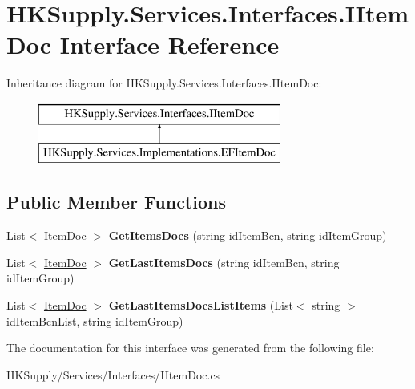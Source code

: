 \hypertarget{interface_h_k_supply_1_1_services_1_1_interfaces_1_1_i_item_doc}{}\section{H\+K\+Supply.\+Services.\+Interfaces.\+I\+Item\+Doc Interface Reference}
\label{interface_h_k_supply_1_1_services_1_1_interfaces_1_1_i_item_doc}
Inheritance diagram for H\+K\+Supply.\+Services.\+Interfaces.\+I\+Item\+Doc\+:\begin{figure}[H]
\begin{center}
\leavevmode
\includegraphics[height=2.000000cm]{interface_h_k_supply_1_1_services_1_1_interfaces_1_1_i_item_doc}
\end{center}
\end{figure}
\subsection*{Public Member Functions}
\begin{DoxyCompactItemize}
\item 
\mbox{\label{interface_h_k_supply_1_1_services_1_1_interfaces_1_1_i_item_doc_acaac1b2e7e7bf479211ee6f120c27627}} 
List$<$ \mbox{\hyperlink{class_h_k_supply_1_1_models_1_1_item_doc}{Item\+Doc}} $>$ {\bfseries Get\+Items\+Docs} (string id\+Item\+Bcn, string id\+Item\+Group)
\item 
\mbox{\label{interface_h_k_supply_1_1_services_1_1_interfaces_1_1_i_item_doc_ad32b697db92728147c0963bf78374998}} 
List$<$ \mbox{\hyperlink{class_h_k_supply_1_1_models_1_1_item_doc}{Item\+Doc}} $>$ {\bfseries Get\+Last\+Items\+Docs} (string id\+Item\+Bcn, string id\+Item\+Group)
\item 
\mbox{\label{interface_h_k_supply_1_1_services_1_1_interfaces_1_1_i_item_doc_adf2c92bb3096479541e8a401f93815b0}} 
List$<$ \mbox{\hyperlink{class_h_k_supply_1_1_models_1_1_item_doc}{Item\+Doc}} $>$ {\bfseries Get\+Last\+Items\+Docs\+List\+Items} (List$<$ string $>$ id\+Item\+Bcn\+List, string id\+Item\+Group)
\end{DoxyCompactItemize}


The documentation for this interface was generated from the following file\+:\begin{DoxyCompactItemize}
\item 
H\+K\+Supply/\+Services/\+Interfaces/I\+Item\+Doc.\+cs\end{DoxyCompactItemize}
